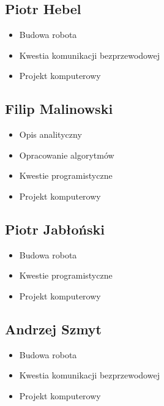 \documentclass[a4paper]{article}
\begin{document}
    \subsection{Piotr Hebel}
        \begin{itemize}
            \item Budowa robota
            \item Kwestia komunikacji bezprzewodowej
            \item Projekt komputerowy
        \end{itemize}
    \subsection{Filip Malinowski}
        \begin{itemize}
            \item Opis analityczny
            \item Opracowanie algorytmów
            \item Kwestie programistyczne
            \item Projekt komputerowy
        \end{itemize}
    \subsection{Piotr Jabłoński}
        \begin{itemize}
            \item Budowa robota
            \item Kwestie programistyczne
            \item Projekt komputerowy
        \end{itemize}
    \subsection{Andrzej Szmyt}
        \begin{itemize}
            \item Budowa robota
            \item Kwestia komunikacji bezprzewodowej
            \item Projekt komputerowy
        \end{itemize}
        
\end{document}
